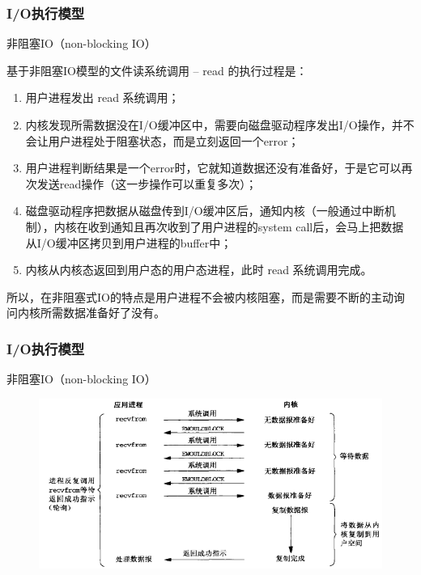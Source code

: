 \begin{frame}[fragile]
    \frametitle{I/O执行模型}
    非阻塞IO（non-blocking IO）
    
    基于非阻塞IO模型的文件读系统调用 – read 的执行过程是：
    \begin{enumerate}
        
        \item 用户进程发出 read 系统调用；
        \item 内核发现所需数据没在I/O缓冲区中，需要向磁盘驱动程序发出I/O操作，并不会让用户进程处于阻塞状态，而是立刻返回一个error；
        \item 用户进程判断结果是一个error时，它就知道数据还没有准备好，于是它可以再次发送read操作（这一步操作可以重复多次）；
        \item 磁盘驱动程序把数据从磁盘传到I/O缓冲区后，通知内核（一般通过中断机制），内核在收到通知且再次收到了用户进程的system call后，会马上把数据从I/O缓冲区拷贝到用户进程的buffer中；
        \item 内核从内核态返回到用户态的用户态进程，此时 read 系统调用完成。
    \end{enumerate}       
    
    所以，在非阻塞式IO的特点是用户进程不会被内核阻塞，而是需要不断的主动询问内核所需数据准备好了没有。
    
\end{frame}
\begin{frame}[fragile]
    \frametitle{I/O执行模型}
    非阻塞IO（non-blocking IO）
    \begin{figure}
        \includegraphics[width=0.7\linewidth]{figs/nonblock-io.png}
    \end{figure}
\end{frame}

